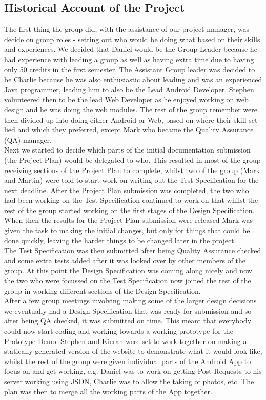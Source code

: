 \documentclass{article}
\begin{document}
		\subsection{Historical Account of the Project}
		The first thing the group did, with the assistance of our project manager, was decide on group roles - setting out who would be doing what based on their skills and experiences. We decided that Daniel would be the Group Leader because he had experience with leading a group as well as having extra time due to having only 50 credits in the first semester. The Assistant Group leader was decided to be Charlie because he was also enthusiastic about leading and was an experienced Java programmer, leading him to also be the Lead Android Developer. Stephen volunteered then to be the lead Web Developer as he enjoyed working on web design and he was doing the web modules. The rest of the group remember were then divided up into doing either Android or Web, based on where their skill set lied and which they preferred, except Mark who became the Quality Assurance (QA) manager. \\

		Next we started to decide which parts of the initial documentation submission (the Project Plan) would be delegated to who. This resulted in most of the group receiving sections of the Project Plan to complete, whilst two of the group (Mark and Martin) were told to start work on writing out the Test Specification for the next deadline. After the Project Plan submission was completed, the two who had been working on the Test Specification continued to work on that whilst the rest of the group started working on the first stages of the Design Specification. When then the results for the Project Plan submission were released Mark was given the task to making the initial changes, but only for things that could be done quickly, leaving the harder things to be changed later in the project. \\

		The Test Specification was then submitted after being Quality Assurance checked and some extra tests added after it was looked over by other members of the group. At this point the Design Specification was coming along nicely and now the two who were focussed on the Test Specification now joined the rest of the group in working different sections of the Design Specification. \\

		After a few group meetings involving making some of the larger design decisions we eventually had a Design Specification that was ready for submission and so after being QA checked, it was submitted on time. This meant that everybody could now start coding and working towards a working prototype for the Prototype Demo. Stephen and Kieran were set to work together on making a statically generated version of the website to demonstrate what it would look like, whilst the rest of the group were given individual parts of the Android App to focus on and get working, e.g. Daniel was to work on getting Post Requests to his server working using JSON, Charlie was to allow the taking of photos, etc. The plan was then to merge all the working parts of the App together. \\
\end{document}
